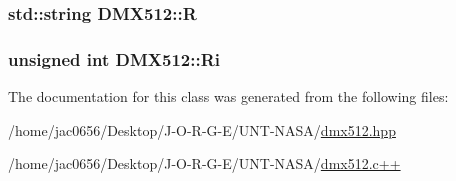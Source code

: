 \subsubsection[{\texorpdfstring{R}{R}}]{\setlength{\rightskip}{0pt plus 5cm}std\+::string D\+M\+X512\+::R}\hypertarget{classDMX512_a231a85f100b6b81a202143d858ed26d1}{}\label{classDMX512_a231a85f100b6b81a202143d858ed26d1}
\subsubsection[{\texorpdfstring{Ri}{Ri}}]{\setlength{\rightskip}{0pt plus 5cm}unsigned int D\+M\+X512\+::\+Ri}\hypertarget{classDMX512_aa5ffc37b24d0a79180d13663a5cf8379}{}\label{classDMX512_aa5ffc37b24d0a79180d13663a5cf8379}


The documentation for this class was generated from the following files\+:\begin{DoxyCompactItemize}
\item 
/home/jac0656/\+Desktop/\+J-\/\+O-\/\+R-\/\+G-\/\+E/\+U\+N\+T-\/\+N\+A\+S\+A/\hyperlink{dmx512_8hpp}{dmx512.\+hpp}\item 
/home/jac0656/\+Desktop/\+J-\/\+O-\/\+R-\/\+G-\/\+E/\+U\+N\+T-\/\+N\+A\+S\+A/\hyperlink{dmx512_8c_09_09}{dmx512.\+c++}\end{DoxyCompactItemize}
